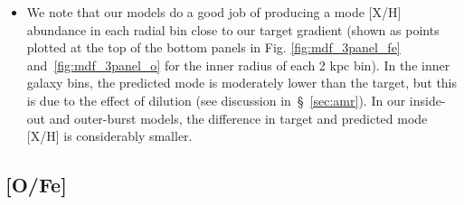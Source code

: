 \documentclass[fleqn, usenatbib]{mnras}
\begin{document}
\begin{itemize}
	\item We note that our models do a good job of producing a mode [X/H] 
	abundance in each radial bin close to our target gradient (shown as 
	points plotted at the top of the bottom panels in Fig. 
	\ref{fig:mdf_3panel_fe} and~\ref{fig:mdf_3panel_o} for the inner radius of 
	each 2 kpc bin). In the inner galaxy bins, the predicted mode is 
	moderately lower than the target, but this is due to the effect of 
	dilution (see discussion in~\S~\ref{sec:amr}). In our inside-out and 
	outer-burst models, the difference in target and predicted mode [X/H] is 
	considerably smaller. 
\end{itemize} 

\subsection{[O/Fe]} 
\label{sec:mdfs:ofe} 
\end{document}
